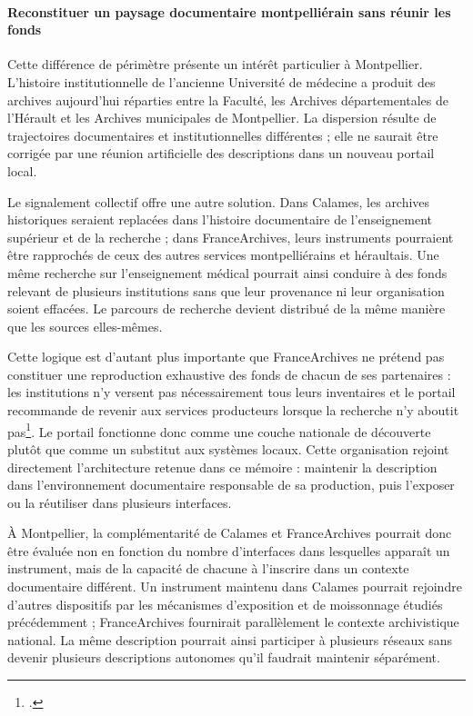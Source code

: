 \paragraph{Reconstituer un paysage documentaire montpelliérain sans réunir les fonds}

Cette différence de périmètre présente un intérêt particulier à Montpellier. L'histoire institutionnelle de l'ancienne Université de médecine a produit des archives aujourd'hui réparties entre la Faculté, les Archives départementales de l'Hérault et les Archives municipales de Montpellier. La dispersion résulte de trajectoires documentaires et institutionnelles différentes ; elle ne saurait être corrigée par une réunion artificielle des descriptions dans un nouveau portail local.

Le \gls{signalement} collectif offre une autre solution. Dans Calames, les archives historiques seraient replacées dans l'histoire documentaire de l'enseignement supérieur et de la recherche ; dans FranceArchives, leurs instruments pourraient être rapprochés de ceux des autres services montpelliérains et héraultais. Une même recherche sur l'enseignement médical pourrait ainsi conduire à des fonds relevant de plusieurs institutions sans que leur provenance ni leur organisation soient effacées. Le parcours de recherche devient distribué de la même manière que les sources elles-mêmes.

Cette logique est d'autant plus importante que FranceArchives ne prétend pas constituer une reproduction exhaustive des fonds de chacun de ses partenaires : les institutions n'y versent pas nécessairement tous leurs inventaires et le portail recommande de revenir aux services producteurs lorsque la recherche n'y aboutit pas\footcite{FranceArchivesContenu2026}. Le portail fonctionne donc comme une couche nationale de découverte plutôt que comme un substitut aux systèmes locaux. Cette organisation rejoint directement l'architecture retenue dans ce mémoire : maintenir la description dans l'environnement documentaire responsable de sa production, puis l'exposer ou la réutiliser dans plusieurs interfaces.

À Montpellier, la complémentarité de Calames et FranceArchives pourrait donc être évaluée non en fonction du nombre d'interfaces dans lesquelles apparaît un instrument, mais de la capacité de chacune à l'inscrire dans un contexte documentaire différent. Un instrument maintenu dans Calames pourrait rejoindre d'autres dispositifs par les mécanismes d'exposition et de \gls{moissonnage} étudiés précédemment ; FranceArchives fournirait parallèlement le contexte archivistique national. La même description pourrait ainsi participer à plusieurs réseaux sans devenir plusieurs descriptions autonomes qu'il faudrait maintenir séparément.

